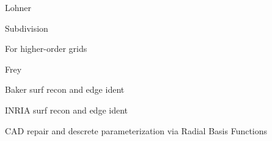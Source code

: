 \documentclass{article}
\begin{document}
Lohner\cite{lohner-regridding-surface}

Subdivision\cite{haimes-imr15-subdivision}

\cite{kim-takano-nakahashi-adjoint-adapt,kim-nakahashi-adjoint-adapt-viscous}

For higher-order grids\cite{unstruct-3d-ho-grid-dg-surf-recon}

Frey\cite{frey-imr9-about-surface-remeshing}

Baker surf recon and edge ident\cite{baker-imr13}

INRIA surf recon and edge ident\cite{borouchaki-surface-reconstruction}

CAD repair and descrete parameterization via Radial Basis Functions
\cite{cad-repair-discrete-param-rbf}



\end{document}
